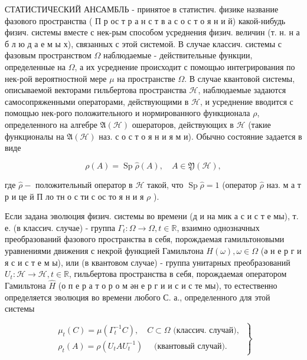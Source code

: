 \documentclass[10pt]{article}
\begin{document}
СТАТИСТИЧЕСКИЙ АНСАМБЛЬ - принятое в статистич. физике название фазового пространства ( П р ос т р а н с т в а с о с т о я н и й) какой-нибудь физич. системы вместе с нек-рым способом усреднения физич. величин (т. н. н а б л ю д а е м ы х), связанных с этой системой. В случае классич. системы с фазовым пространством $\Omega$ наблюдаемые - действительные функции, определенные на $\Omega$, а их усреднение происходит с помощью интегрирования по нек-рой вероятностной мере $\mu$ на пространстве $\Omega$. В случае квантовой системы, описываемой векторами гильбертова пространства $\mathscr{H}$, наблюдаемые задаются самосопряженными операторами, действующими в $\mathscr{H}$, и усреднение вводится с помощью нек-рого положительного и нормированного функционала $\rho$, определенного на алгебре $\mathfrak{A}(\mathscr{H})$ ошераторов, действующих в $\mathscr{H}$ (такие функционалы на $\mathfrak{A}(\mathscr{H})$ наз. с о с т о я н и я м и). Обычно состояние задается в виде



\[

\rho(A)=\operatorname{Sp} \hat{\rho}(A), \quad A \in \mathfrak{Y}(\mathscr{H}),

\]



где $\hat{\rho}-$ положительный оператор в $\mathscr{H}$ такой, что $\operatorname{Sp} \hat{\rho}=1$ (оператор $\hat{\rho}$ наз. м а т р и це й П ло тн о с ти с ос то я н и я $\rho$ ).



Если задана эволюция физич. системы во времени (д и на мик а с и с т е мы), т. е. (в классич. случае) - группа $\Gamma_{t}: \Omega \rightarrow \Omega, t \in \mathbb{R}$, взаимно однозначных преобразований фазового пространства в себя, порождаемая гамильтоновыми уравнениями движения с некрой функцией Гамильтона $H(\omega), \omega \in \Omega$ (ә н е р г и я с и с т е м ы), или (в квантовом случае) - группа унитарных преобразований $U_{t}: \mathscr{H} \rightarrow \mathscr{H}, t \in \mathbb{R}$, гильбертова пространства в себя, порождаемая оператором Гамильтона $\hat{H}$ (о п е р а т о р о м ән е р г и и с и с те мы), то естественно определяется эволюция во времени любого С. а., определенного для этой системы



\[

\left.\begin{array}{l}

\mu_{t}(C)=\mu\left(\Gamma_{t}^{-1} C\right), \quad C \subset \Omega \text { (классич. случай), } \\

\rho_{t}(A)=\rho\left(U_{t} A U_{t}^{-1}\right) \quad \text { (квантовый случай). }

\end{array}\right\}

\]
\end{document}
